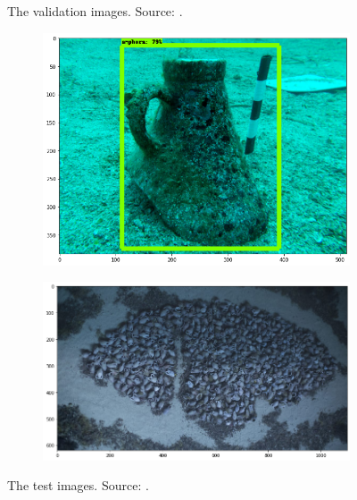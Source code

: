 \documentclass[a4paper, 11pt, oneside]{article}
\begin{document}
\begin{figure}[ht]
\begin{subfigure}[ht]{0.4\textwidth}
  \end{subfigure}
  \caption{The validation images. Source:
  \cite{scuba, itinari, whoi, phoenician, auscape, hakai, groplan}.}
  \label{fig:val}
\end{figure}

\begin{figure}[ht]
  \centering
  \begin{subfigure}[ht]{0.8\textwidth}
      \centering
      \includegraphics[width=\textwidth]{test_1.png}
  \end{subfigure}
  \bigskip
  \begin{subfigure}[ht]{0.8\textwidth}
      \centering
      \includegraphics[width=\textwidth]{test_2.png}
  \end{subfigure}
  \caption{The test images. Source: \cite{ionian, sanisera}.}
  \label{fig:test}
\end{figure}
\end{document}

